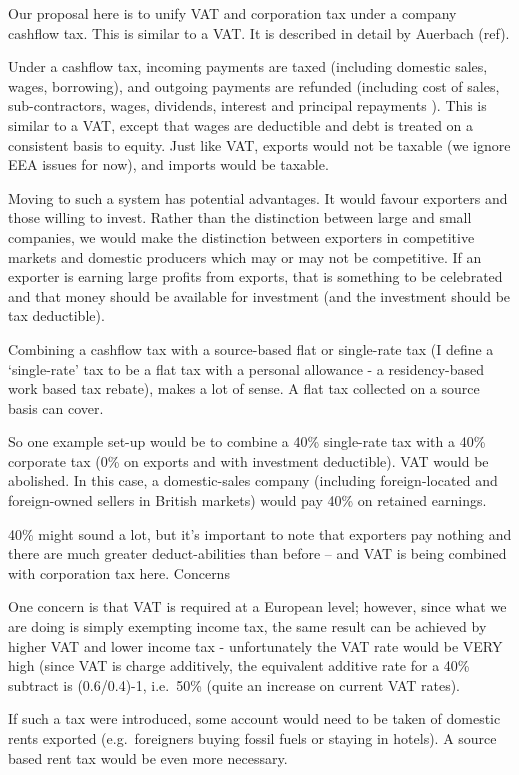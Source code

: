 \documentclass[]{tufte-handout}
\begin{document}
Our proposal here is to unify VAT and corporation tax under a company
cashflow tax. This is similar to a VAT. It is described in detail by
Auerbach (ref).

Under a cashflow tax, incoming payments are taxed (including domestic
sales, wages, borrowing), and outgoing payments are refunded (including
cost of sales, sub-contractors, wages, dividends, interest and principal
repayments ). This is similar to a VAT, except that wages are deductible
and debt is treated on a consistent basis to equity. Just like VAT,
exports would not be taxable (we ignore EEA issues for now), and imports
would be taxable.

Moving to such a system has potential advantages. It would favour
exporters and those willing to invest. Rather than the distinction
between large and small companies, we would make the distinction between
exporters in competitive markets and domestic producers which may or may
not be competitive. If an exporter is earning large profits from
exports, that is something to be celebrated and that money should be
available for investment (and the investment should be tax deductible).

Combining a cashflow tax with a source-based flat or single-rate tax (I
define a `single-rate' tax to be a flat tax with a personal allowance -
a residency-based work based tax rebate), makes a lot of sense. A flat
tax collected on a source basis can cover.

So one example set-up would be to combine a 40\% single-rate tax with a
40\% corporate tax (0\% on exports and with investment deductible). VAT
would be abolished. In this case, a domestic-sales company (including
foreign-located and foreign-owned sellers in British markets) would pay
40\% on retained earnings.

40\% might sound a lot, but it's important to note that exporters pay
nothing and there are much greater deduct-abilities than before -- and
VAT is being combined with corporation tax here. Concerns

One concern is that VAT is required at a European level; however, since
what we are doing is simply exempting income tax, the same result can be
achieved by higher VAT and lower income tax - unfortunately the VAT rate
would be VERY high (since VAT is charge additively, the equivalent
additive rate for a 40\% subtract is (0.6/0.4)-1, i.e.~50\% (quite an
increase on current VAT rates).

If such a tax were introduced, some account would need to be taken of
domestic rents exported (e.g.~foreigners buying fossil fuels or staying
in hotels). A source based rent tax would be even more necessary.
\end{document}
